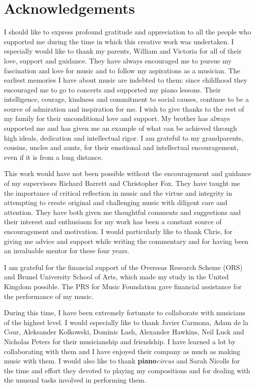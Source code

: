 \chapter*{Acknowledgements}

I should like to express profound gratitude and appreciation to all the people who supported me during the time in which this creative work was undertaken. I especially would like to thank my parents, William and Victoria for all of their love, support and guidance. They have always encouraged me to pursue my fascination and love for music and to follow my aspirations as a musician. The earliest memories I have about music are indebted to them: since childhood they encouraged me to go to concerts and supported my piano lessons. Their intelligence, courage, kindness and commitment to social causes, continue to be a source of admiration and inspiration for me. I wish to give thanks to the rest of my family for their unconditional love and support. My brother has always supported me and has given me an example of what can be achieved through high ideals, dedication and intellectual rigor. I am grateful to my grandparents, cousins, uncles and aunts, for their emotional and intellectual encouragement, even if it is from a long distance.

This work would have not been possible without the encouragement and guidance of my supervisors Richard Barrett and Christopher Fox. They have taught me the importance of  critical reflection in music and the virtue and integrity in attempting to create original and challenging music with diligent care and attention. They have both given me thoughtful comments and suggestions and their interest and enthusiasm for my work has been a constant source of encouragement and motivation. I would particularly like to thank Chris, for giving me advice and support while writing the commentary and for having been an invaluable mentor for these four years.

I am grateful for the financial support of the Overseas Research Scheme (ORS) and Brunel University School of Arts, which made my study in the United Kingdom possible. The PRS for Music Foundation gave financial assistance for the performance of my music.

During this time, I have been extremely fortunate to collaborate with musicians of the highest level. I would especially like to thank Javier Carmona, Adam de la Cour, Aleksander Kolkowski, Dominic Lash, Alexander Hawkins, Neil Luck and Nicholas Peters for their musicianship and friendship. I have learned a lot by collaborating with them and I have enjoyed their company as much as making music with them. I would also like to thank \textbf{piano}\emph{circus} and Sarah Nicolls for the time and effort they devoted to playing my compositions and for dealing with the unusual tasks involved in performing them.
 
